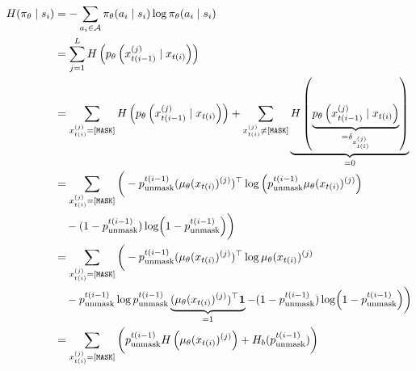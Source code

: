 {\allowdisplaybreaks
    \begin{align}
        H(\pi_\theta \mid s_i)
         & = -\sum_{a_i \in \mathcal{A}} \pi_\theta(a_i \mid s_i) \log \pi_\theta(a_i \mid s_i) \nonumber                                                                                                                                                                                                     \\
         & = \sum_{j=1}^L H\left(p_\theta\left(x_{t(i - 1)}^{(j)} \mid x_{t(i)}\right)\right) \nonumber                                                                                                                                                                                                       \\
         & = \sum_{x_{t(i)}^{(j)} = [\mathtt{MASK}]} H\left(p_\theta\left(x_{t(i - 1)}^{(j)} \mid x_{t(i)}\right)\right) + \sum_{x_{t(i)}^{(j)} \neq [\mathtt{MASK}]} \underbrace{H\left(\underbrace{p_\theta\left(x_{t(i - 1)}^{(j)} \mid x_{t(i)}\right)}_{=\delta_{x_{t(i)}^{(j)}}}\right)}_{=0} \nonumber \\
         & = \sum_{x_{t(i)}^{(j)} = [\mathtt{MASK}]} \bigg( -p_{\text{unmask}}^{t(i - 1)} (\mu_\theta(x_{t(i)})^{(j)})^\top \log \left( p_{\text{unmask}}^{t(i - 1)} \mu_\theta(x_{t(i)})^{(j)} \right) \nonumber                                                                                             \\
         & \quad - (1 - p_{\text{unmask}}^{t(i - 1)}) \log (1 - p_{\text{unmask}}^{t(i - 1)}) \bigg) \nonumber                                                                                                                                                                                                \\
         & = \sum_{x_{t(i)}^{(j)} = [\mathtt{MASK}]} \bigg( -p_{\text{unmask}}^{t(i - 1)} (\mu_\theta(x_{t(i)})^{(j)})^\top \log \mu_\theta(x_{t(i)})^{(j)} \nonumber                                                                                                                                         \\
         & \quad - p_{\text{unmask}}^{t(i - 1)} \log p_{\text{unmask}}^{t(i - 1)} \underbrace{(\mu_\theta(x_{t(i)})^{(j)})^\top \bold{1}}_{=1} - (1 - p_{\text{unmask}}^{t(i - 1)}) \log (1 - p_{\text{unmask}}^{t(i - 1)}) \bigg) \nonumber                                                                  \\
         & = \sum_{x_{t(i)}^{(j)} = [\mathtt{MASK}]} \bigg( p_{\text{unmask}}^{t(i - 1)} H\left(\mu_\theta(x_{t(i)})^{(j)}\right) + H_b(p_{\text{unmask}}^{t(i - 1)}) \bigg) \nonumber                                                                                                                        \\

\end{align}}
